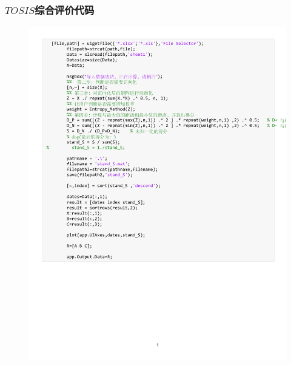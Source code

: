 \documentclass[UTF8]{ctexart}
\begin{document}
\subsubsection{$TOSIS$综合评价代码}
\begin{figure}[H] %
    \centering %
    \includegraphics[width=1.2\textwidth]{./code/ESS.pdf} %
\end{figure}
\end{document}
